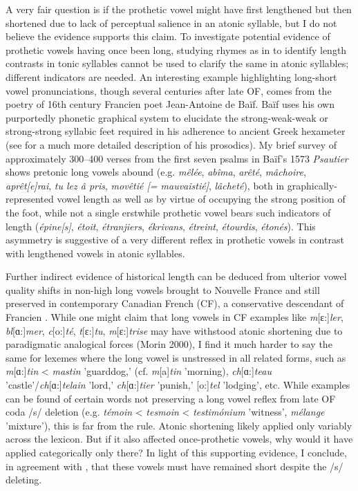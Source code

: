 \documentclass[output=paper,colorlinks,citecolor=brown,
]{langscibook}
\begin{document}
A very fair question is if the prothetic vowel might have first lengthened but then shortened due to lack of perceptual salience in an atonic syllable, but I do not believe the evidence supports this claim.  To investigate potential evidence of prothetic vowels having once been long, studying rhymes as in \citet{Gess2001} to identify length contrasts in tonic syllables cannot be used to clarify the same in atonic syllables; different indicators are needed.  An interesting example highlighting long-short vowel pronunciations, though several centuries after late OF, comes from the poetry of 16th century Francien poet Jean-Antoine de Baïf.  Baïf uses his own purportedly phonetic graphical system to elucidate the strong-weak-weak or strong-strong syllabic feet required in his adherence to ancient Greek hexameter (see \citet{Morin1999, Morin2000} for a much more detailed description of his prosodics).  My brief survey of approximately 300--400 verses from the first seven psalms in Baïf's 1573 \textit{Psautier} \citep{Bettens2008} shows pretonic long vowels abound (e.g. \textit{mêlée}, \textit{abîma}, \textit{arêté}, \textit{mâchoire}, \textit{aprêt[e]rai}, \textit{tu lez â pris}, \textit{movêtié [= mauvaistié]}, \textit{lâcheté}), both in graphically-represented vowel length as well as by virtue of occupying the strong position of the foot, while not a single erstwhile prothetic vowel bears such indicators of length (\textit{épine[s]}, \textit{étoit}, \textit{étranjiers}, \textit{ékrivans}, \textit{étreint}, \textit{étourdis}, \textit{étonés}).  This asymmetry is suggestive of a very different reflex in prothetic vowels in contrast with lengthened vowels in atonic syllables.

Further indirect evidence of historical length can be deduced from ulterior vowel quality shifts in non-high long vowels brought to Nouvelle France and still preserved in contemporary Canadian French (CF), a conservative descendant of Francien \citep{Gess2001, Gess2008, Picard2004}.  While one might claim that long vowels in CF examples like \textit{m}[ɛ:]\textit{ler}, \textit{bl}[ɑ:]\textit{mer}, \textit{c}[o:]\textit{té}, \textit{t}[ɛ:]\textit{tu}, \textit{m}[ɛ:]\textit{trise} \citep{Walker1984, Picard2004} may have withstood atonic shortening due to paradigmatic analogical forces (Morin 2000), I find it much harder to say the same for lexemes where the long vowel is unstressed in all related forms, such as \textit{m}[ɑ:]\textit{tin} < \textit{mastin} 'guarddog,' (cf. \textit{m}[a]\textit{tin} 'morning), \textit{ch}[ɑ:]\textit{teau} 'castle'/\textit{ch}[ɑ:]\textit{telain} 'lord,' \textit{ch}[ɑ:]\textit{tier} 'punish,' [o:]\textit{tel} 'lodging', etc.  While examples can be found of certain words not preserving a long vowel reflex from late OF coda /s/ deletion (e.g. \textit{témoin} < \textit{tesmoin} < \textit{testimónium} 'witness', \textit{mélange} 'mixture'), this is far from the rule.  Atonic shortening likely applied only variably across the lexicon.  But if it also affected once-prothetic vowels, why would it have applied categorically only there?  In light of this supporting evidence, I conclude, in agreement with \citet{Pope1952}, that these vowels must have remained short despite the /s/ deleting.
\end{document}
